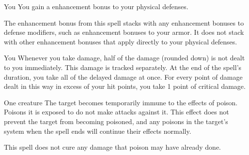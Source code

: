 \begin{spellheader}
    \spelldur{\durlong}
\end{spellheader}
\begin{spelleffects}
    \begin{spelltarget}{You}
        \spelleffect You gain a  enhancement bonus to your physical defenses. \spellbonusscalingdescription
    \end{spelltarget}
\end{spelleffects}
\begin{spellfooter}
    \spellnotes The enhancement bonus from this spell stacks with any enhancement bonuses to defense modifiers, such as enhancement bonuses to your armor. It does not stack with other enhancement bonuses that apply directly to your physical defenses. 
\end{spellfooter}

\begin{spellheader}
    \spelldur{\durmed}
\end{spellheader}
\begin{spelleffects}
    \begin{spelltarget}{You}
        \spelleffect Whenever you take damage, half of the damage (rounded down) is not dealt to you immediately. This damage is tracked separately. At the end of the spell's duration, you take all of the delayed damage at once. For every point of damage dealt in this way in excess of your hit points, you take 1 point of critical damage.
    \end{spelltarget}
\end{spelleffects}

\begin{spellheader}
    \spellrng{\rngclose}
    \spelldur{\durshort}
\end{spellheader}
\begin{spelleffects}
    \begin{spelltarget}{One creature}
        \spelleffect The target becomes temporarily immune to the effects of poison. Poisons it is exposed to do not make attacks against it. This effect does not prevent the target from becoming poisoned, and any poisons in the target's system when the spell ends will continue their effects normally. 
    \end{spelltarget}
\end{spelleffects}
\begin{spellfooter}
    \spellnotes This spell does not cure any damage that poison may have already done.
\end{spellfooter}

